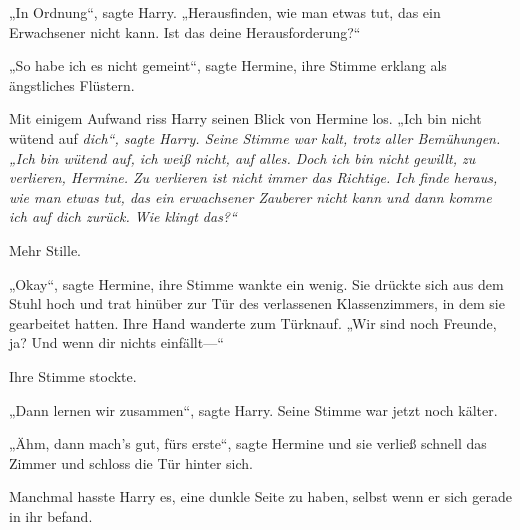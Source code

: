 „In Ordnung“, sagte Harry. „Herausfinden, wie man etwas tut, das ein Erwachsener nicht kann. Ist das deine Herausforderung?“

„So habe ich es nicht gemeint“, sagte Hermine, ihre Stimme erklang als ängstliches Flüstern.

Mit einigem Aufwand riss Harry seinen Blick von Hermine los. „Ich bin nicht wütend auf \emph{dich“, sagte Harry. Seine Stimme war kalt, trotz aller Bemühungen. „Ich bin wütend auf, ich weiß nicht, auf alles. Doch ich bin nicht gewillt, zu verlieren, Hermine. Zu verlieren ist nicht immer das Richtige. Ich finde heraus, wie man etwas tut, das ein erwachsener Zauberer nicht kann und dann komme ich auf dich zurück. Wie klingt das?“}

Mehr Stille.

„Okay“, sagte Hermine, ihre Stimme wankte ein wenig. Sie drückte sich aus dem Stuhl hoch und trat hinüber zur Tür des verlassenen Klassenzimmers, in dem sie gearbeitet hatten. Ihre Hand wanderte zum Türknauf. „Wir sind noch Freunde, ja? Und wenn dir nichts einfällt—“

Ihre Stimme stockte.

„Dann lernen wir zusammen“, sagte Harry. Seine Stimme war jetzt noch kälter.

„Ähm, dann mach’s gut, fürs erste“, sagte Hermine und sie verließ schnell das Zimmer und schloss die Tür hinter sich.

Manchmal hasste Harry es, eine dunkle Seite zu haben, selbst wenn er sich gerade in ihr befand.

